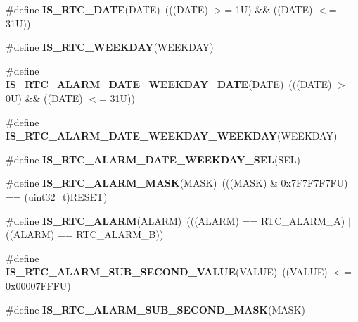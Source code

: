 \begin{DoxyCompactItemize}
\item 
\mbox{\label{group___r_t_c___i_s___r_t_c___definitions_ga3b6e966e144cb0495563ef0283d16510}} 
\#define {\bfseries I\+S\+\_\+\+R\+T\+C\+\_\+\+D\+A\+TE}(D\+A\+TE)~(((D\+A\+TE) $>$= 1\+U) \&\& ((\+D\+A\+T\+E) $<$= 31\+U))
\item 
\#define {\bfseries I\+S\+\_\+\+R\+T\+C\+\_\+\+W\+E\+E\+K\+D\+AY}(W\+E\+E\+K\+D\+AY)
\item 
\mbox{\label{group___r_t_c___i_s___r_t_c___definitions_ga8b6cb39fac113de7c5d2b05a93093243}} 
\#define {\bfseries I\+S\+\_\+\+R\+T\+C\+\_\+\+A\+L\+A\+R\+M\+\_\+\+D\+A\+T\+E\+\_\+\+W\+E\+E\+K\+D\+A\+Y\+\_\+\+D\+A\+TE}(D\+A\+TE)~(((D\+A\+TE) $>$ 0\+U) \&\& ((\+D\+A\+T\+E) $<$= 31\+U))
\item 
\#define {\bfseries I\+S\+\_\+\+R\+T\+C\+\_\+\+A\+L\+A\+R\+M\+\_\+\+D\+A\+T\+E\+\_\+\+W\+E\+E\+K\+D\+A\+Y\+\_\+\+W\+E\+E\+K\+D\+AY}(W\+E\+E\+K\+D\+AY)
\item 
\#define {\bfseries I\+S\+\_\+\+R\+T\+C\+\_\+\+A\+L\+A\+R\+M\+\_\+\+D\+A\+T\+E\+\_\+\+W\+E\+E\+K\+D\+A\+Y\+\_\+\+S\+EL}(S\+EL)
\item 
\mbox{\label{group___r_t_c___i_s___r_t_c___definitions_ga166108e7bf226d4ea345822eb81ea358}} 
\#define {\bfseries I\+S\+\_\+\+R\+T\+C\+\_\+\+A\+L\+A\+R\+M\+\_\+\+M\+A\+SK}(M\+A\+SK)~(((M\+A\+SK) \& 0x7\+F7\+F7\+F7\+F\+U) == (uint32\+\_\+t)\+R\+E\+S\+E\+T)
\item 
\mbox{\label{group___r_t_c___i_s___r_t_c___definitions_gab101ad18b0bcde557eb8caac469d7725}} 
\#define {\bfseries I\+S\+\_\+\+R\+T\+C\+\_\+\+A\+L\+A\+RM}(A\+L\+A\+RM)~(((A\+L\+A\+RM) == R\+T\+C\+\_\+\+A\+L\+A\+R\+M\+\_\+A) $\vert$$\vert$ ((A\+L\+A\+RM) == R\+T\+C\+\_\+\+A\+L\+A\+R\+M\+\_\+B))
\item 
\mbox{\label{group___r_t_c___i_s___r_t_c___definitions_gae7cd07c18cdb2946a2b06f6606ede93c}} 
\#define {\bfseries I\+S\+\_\+\+R\+T\+C\+\_\+\+A\+L\+A\+R\+M\+\_\+\+S\+U\+B\+\_\+\+S\+E\+C\+O\+N\+D\+\_\+\+V\+A\+L\+UE}(V\+A\+L\+UE)~((V\+A\+L\+UE) $<$= 0x00007\+F\+F\+F\+U)
\item 
\#define {\bfseries I\+S\+\_\+\+R\+T\+C\+\_\+\+A\+L\+A\+R\+M\+\_\+\+S\+U\+B\+\_\+\+S\+E\+C\+O\+N\+D\+\_\+\+M\+A\+SK}(M\+A\+SK)
\end{DoxyCompactItemize}


